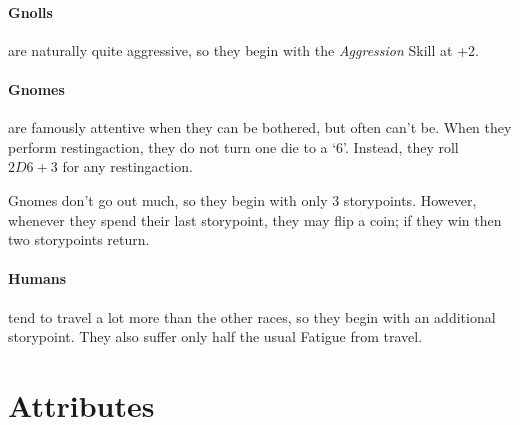 \begin{multicols}{2}
{\paragraph{Gnolls}
are naturally quite aggressive, so they begin with the \textit{Aggression} Skill at +2.

\paragraph{Gnomes}
are famously attentive when they can be bothered, but often can't be.
When they perform \gls{restingaction}, they do not turn one die to a `6'.
Instead, they roll $2D6+3$ for any \gls{restingaction}.

Gnomes don't go out much, so they begin with only 3 \glspl{storypoint}.
However, whenever they spend their last \gls{storypoint}, they may flip a coin; if they win then two \glspl{storypoint} return.

\paragraph{Humans}
tend to travel a lot more than the other races, so they begin with an additional \gls{storypoint}.
They also suffer only half the usual Fatigue from travel.

}

\end{multicols}

\section{Attributes}

